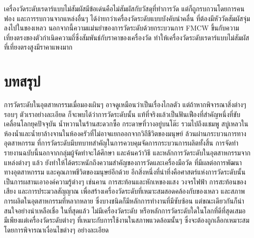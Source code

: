 \documentclass[final,11pt]{article}
\begin{document}
เครื่องวัดระดับเรดาร์แบบไม่สัมผัสมีข้อเด่นคือไม่สัมผัสกับวัสดุที่ทำการวัด แต่ก็ถูกรบกวนโดยการคน 
ฟอง และการรบกวนจากแหล่งอื่นๆ ได้ง่ายกว่าเครื่องวัดระดับแบบบังคับนำคลื่น ที่ต้องมีหัววัดสัมผัสจุ่มลงไปในของเหลว นอกจากนี้ความแม่นยำของการวัดระดับด้วยกระบวนการ
FMCW ขึ้นกับความเที่ยงตรงของตัวกำเนิดความถี่ซึ่งสัมพันธ์กับราคาของเครื่องวัด ทำให้เครื่องวัดระดับเรดาร์แบบไม่สัมผัสที่เที่ยงตรงสูงมีราคาแพงมาก
\newpage
\section{บทสรุป}
การวัดระดับในอุตสาหกรรมเมื่อมองเผินๆ อาจดูเหมือนว่าเป็นเรื่องไกลตัว แต่ถ้าหากพิจารณาสิ่งต่างๆ รอบๆ ตัวเราอย่างละเอียด ก็จะพบได้ว่าการวัดระดับนั้น 
แท้ที่จริงแล้วเป็นฟันเฟืองที่สำคัญหนึ่งที่ขับเคลื่อนโลกยุคปัจจุบัน น้ำหวานในร้านสะดวกซื้อ กระดาษที่วางอยู่บนโต๊ะ
รวมไปถึงแชมพู สบู่เหลวในห้องน้ำและน้ำยาล้างจานในห้องครัวที่ไม่อาจแยกออกจากวิถีชีวิตของมนุษย์ ล้วนผ่านกระบวนการทางอุตสาหกรรม
ที่การวัดระดับมีบทบาทสำคัญในการควบคุมจัดการกระบวนการผลิตทั้งสิ้น การจัดทำรายงานฉบับนี้นอกจากกลุ่มผู้จัดทำจะได้ศึกษา 
และค้นคว้าวิธี และหลักการวัดระดับในอุตสาหกรรมจากแหล่งต่างๆ แล้ว ยังทำให้ได้ตระหนักถึงความสำคัญของการวัดและเครื่องมือวัด ที่มีผลต่อการพัฒนาทางอุตสาหกรรม
และคุณภาพชีวิตของมนุษย์อีกด้วย อีกสิ่งหนึ่งที่น่าทึ่งคือศาสตร์แห่งการวัดระดับนั้นเป็นการผสานเอาองค์ความรู้ต่างๆ เช่นคาน การสะท้อนและหักเหของแสง วงจรไฟฟ้า 
การสะท้อนของเสียง และการประมวลสัญญาณ เพื่อสร้างเครื่องวัดระดับที่เหมาะสมสอดคล้องกับของเหลว และสภาพการผลิตในอุตสาหกรรมที่หลากหลาย 
ซึ่งบางชนิดก็มีหลักการทำงานที่มีซับซ้อน แต่ขณะเดียวกันก็น่าสนใจอย่างน่าเหลือเชื่อ ในที่สุดแล้ว 
ไม่มีเครื่องวัดระดับ หรือหลักการวัดระดับใดในโลกที่ดีที่สุดเสมอ มีเพียงแต่เครื่องวัดระดับต่างๆ ที่เหมาะกับการใช้งานในสภาพแวดล้อมนั้นๆ 
ซึ่งจะต้องถูกเลือกเหมาะสมโดยการพิจารณาเงื่อนไขต่างๆ อย่างละเอียด
\newpage
\nocite{*}


\end{document}
